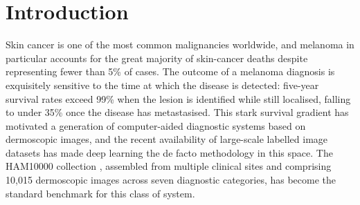 \documentclass[11pt,a4paper]{report}  %
\begin{document}
\chapter{Introduction}
\label{ch:intro}



Skin cancer is one of the most common malignancies worldwide, and
melanoma in particular accounts for the great majority of skin-cancer
deaths despite representing fewer than 5\% of cases. The outcome of a
melanoma diagnosis is exquisitely sensitive to the time at which the
disease is detected: five-year survival rates exceed 99\% when the
lesion is identified while still localised, falling to under 35\% once
the disease has metastasised. This stark survival gradient has
motivated a generation of computer-aided diagnostic systems based on
dermoscopic images, and the recent availability of large-scale
labelled image datasets has made deep learning the de facto
methodology in this space. The HAM10000 collection
\citep{tschandl2018ham10000}, assembled from multiple clinical sites
and comprising 10{,}015 dermoscopic images across seven diagnostic
categories, has become the standard benchmark for this class of
system.
\end{document}
